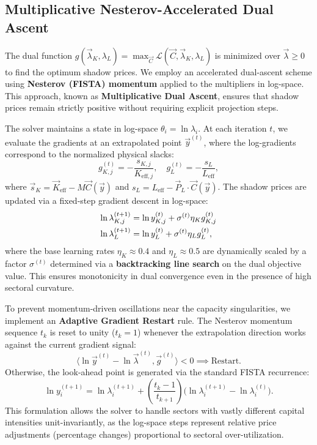 \subsection{Multiplicative Nesterov-Accelerated Dual Ascent}

The dual function $g(\vec{\lambda}_K, \lambda_L) = \max_{\vec{C}} \mathcal{L}(\vec{C}, \vec{\lambda}_K, \lambda_L)$ is minimized over $\vec{\lambda} \geq 0$ to find the optimum shadow prices.
We employ an accelerated dual-ascent scheme using \textbf{Nesterov (FISTA) momentum} applied to the multipliers in log-space. This approach, known as \textbf{Multiplicative Dual Ascent}, ensures that shadow prices remain strictly positive without requiring explicit projection steps.

The solver maintains a state in log-space $\theta_i = \ln \lambda_i$. At each iteration $t$, we evaluate the gradients at an extrapolated point $\vec{y}^{(t)}$, where the log-gradients correspond to the normalized physical slacks:
%
\begin{equation}\label{eq:slacks}
  g_{K,j}^{(t)} = -\frac{s_{K,j}}{K_{\mathrm{eff},j}}, \quad
  g_L^{(t)} = -\frac{s_L}{L_{\mathrm{eff}}},
\end{equation}
%
where $\vec{s}_K = \vec{K}_{\mathrm{eff}} - M\vec{C}(\vec{y})$ and $s_L = L_{\mathrm{eff}} - \vec{P}_{L} \cdot \vec{C}(\vec{y})$.
The shadow prices are updated via a fixed-step gradient descent in log-space:
%
\begin{align}\label{eq:dual_update}
  \ln \lambda_{K,j}^{(t+1)} &= \ln y_{K,j}^{(t)} + \sigma^{(t)} \eta_K g_{K,j}^{(t)} \notag \\
  \ln \lambda_{L}^{(t+1)} &= \ln y_{L}^{(t)} + \sigma^{(t)} \eta_L g_L^{(t)},
\end{align}
%
where the base learning rates $\eta_K \approx 0.4$ and $\eta_L \approx 0.5$ are dynamically scaled by a factor $\sigma^{(t)}$ determined via a \textbf{backtracking line search} on the dual objective value. This ensures monotonicity in dual convergence even in the presence of high sectoral curvature.

To prevent momentum-driven oscillations near the capacity singularities, we implement an \textbf{Adaptive Gradient Restart} rule. The Nesterov momentum sequence $t_k$ is reset to unity ($t_k = 1$) whenever the extrapolation direction works against the current gradient signal:
%
\begin{equation}
  \langle \ln \vec{y}^{(t)} - \ln \vec{\lambda}^{(t)}, \vec{g}^{(t)} \rangle < 0 \implies \text{Restart}.
\end{equation}
%
Otherwise, the look-ahead point is generated via the standard FISTA recurrence:
%
\begin{equation}\label{eq:extrapolation}
  \ln y_{i}^{(t+1)} = \ln \lambda_i^{(t+1)} + \left(\frac{t_k - 1}{t_{k+1}}\right) \bigl(\ln \lambda_i^{(t+1)} - \ln \lambda_i^{(t)}\bigr).
\end{equation}
%
This formulation allows the solver to handle sectors with vastly different capital intensities unit-invariantly, as the log-space steps represent relative price adjustments (percentage changes) proportional to sectoral over-utilization.


